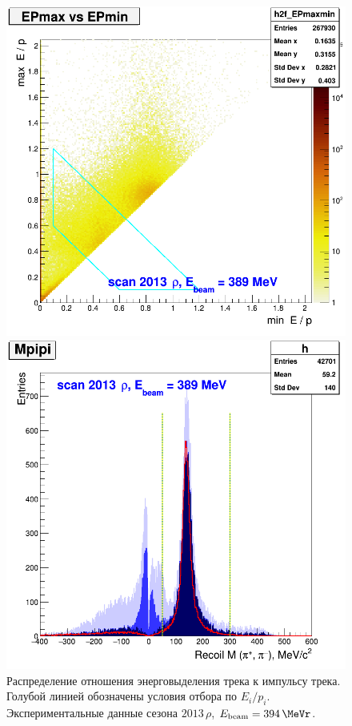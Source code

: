 \begin{figure}
    \begin{minipage}[t]{0.45\textwidth}
        \includegraphics[width=\textwidth]{img/h2f_EPmaxmin_zoom.png}
        \caption{Распределение отношения энерговыделения трека к импульсу трека.
            Голубой линией обозначены условия отбора по $E_i / p_i$.
            Экспериментальные данные сезона $2013 \, \rho$, $E_{\text{beam}} = \SI{394}{\MeVr}$.}
        \label{fig:3pi_EPmaxmin_zoom}
    \end{minipage}
    \qquad
    \begin{minipage}[t]{0.45\textwidth}
        \includegraphics[width=\textwidth]{img/mpipi.png}

\end{minipage}
\end{figure}
